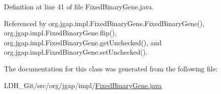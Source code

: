 Definition at line 41 of file Fixed\-Binary\-Gene.\-java.



Referenced by org.\-jgap.\-impl.\-Fixed\-Binary\-Gene.\-Fixed\-Binary\-Gene(), org.\-jgap.\-impl.\-Fixed\-Binary\-Gene.\-flip(), org.\-jgap.\-impl.\-Fixed\-Binary\-Gene.\-get\-Unchecked(), and org.\-jgap.\-impl.\-Fixed\-Binary\-Gene.\-set\-Unchecked().



The documentation for this class was generated from the following file\-:\begin{DoxyCompactItemize}
\item 
L\-D\-H\-\_\-\-Git/src/org/jgap/impl/\hyperlink{_fixed_binary_gene_8java}{Fixed\-Binary\-Gene.\-java}\end{DoxyCompactItemize}
